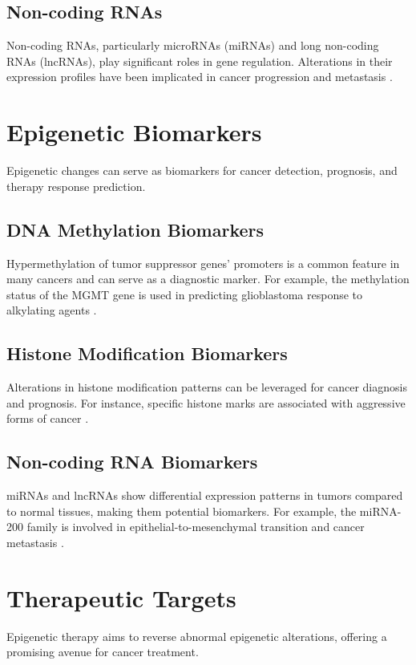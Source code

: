 \documentclass{article}
\begin{document}
\subsection{Non-coding RNAs}
Non-coding RNAs, particularly microRNAs (miRNAs) and long non-coding RNAs (lncRNAs), play significant roles in gene regulation. Alterations in their expression profiles have been implicated in cancer progression and metastasis \cite{Esteller2011}.

\section{Epigenetic Biomarkers}
Epigenetic changes can serve as biomarkers for cancer detection, prognosis, and therapy response prediction.

\subsection{DNA Methylation Biomarkers}
Hypermethylation of tumor suppressor genes' promoters is a common feature in many cancers and can serve as a diagnostic marker. For example, the methylation status of the MGMT gene is used in predicting glioblastoma response to alkylating agents \cite{Hegi2005}.

\subsection{Histone Modification Biomarkers}
Alterations in histone modification patterns can be leveraged for cancer diagnosis and prognosis. For instance, specific histone marks are associated with aggressive forms of cancer \cite{Fang2007}.

\subsection{Non-coding RNA Biomarkers}
miRNAs and lncRNAs show differential expression patterns in tumors compared to normal tissues, making them potential biomarkers. For example, the miRNA-200 family is involved in epithelial-to-mesenchymal transition and cancer metastasis \cite{Mullany2011}.

\section{Therapeutic Targets}
Epigenetic therapy aims to reverse abnormal epigenetic alterations, offering a promising avenue for cancer treatment.
\end{document}
